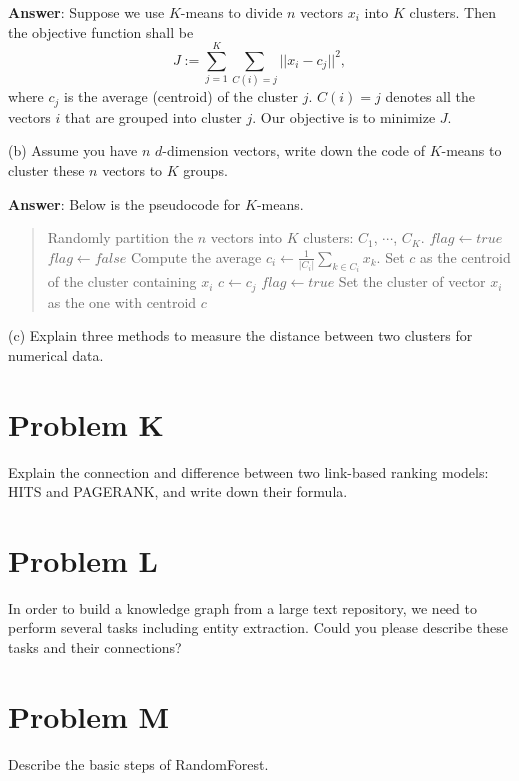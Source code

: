 \documentclass{article}
\begin{document}
{\bf Answer}:
Suppose we use $K$-means to divide $n$ vectors $x_i$ into $K$ clusters. Then the objective function shall be
$$J := \sum_{j=1} ^K \sum_{C(i) = j} ||x_i - c_j||^2,$$
where $c_j$ is the average (centroid) of the cluster $j$. $C(i) = j$ denotes all the vectors $i$ that are grouped into cluster $j$. Our objective is to minimize $J$.

(b) Assume you have $n$ $d$-dimension vectors, write down the code of $K$-means to cluster these $n$ vectors to $K$ groups.

{\bf Answer}: Below is the pseudocode for $K$-means.
\begin{quote}
\centering
\begin{algorithmic}
\State Randomly partition the $n$ vectors into $K$ clusters: $C_1$, $\cdots$, $C_K$.
\State $flag \gets true$
  \State $flag \gets false$
    \State Compute the average $c_i \gets \frac{1}{|C_i|}\sum_{k\in C_i} x_k$.
  \EndFor
    \State Set $c$ as the centroid of the cluster containing $x_i$
        \State $c \gets c_j$
        \State $flag \gets true$
      \EndIf
    \EndFor
    \State  Set the cluster of vector $x_i$ as the one with centroid $c$
  \EndFor
\EndWhile
\end{algorithmic}
\end{quote}

(c) Explain three methods to measure the distance between two clusters for numerical data.

\section{Problem K}
Explain the connection and difference between two link-based ranking models: HITS and PAGERANK, and write down their formula.

\section{Problem L}
In order to build a knowledge graph from a large text repository, we need to perform several tasks including entity extraction. Could you please describe these tasks and their connections?

\section{Problem M}
Describe the basic steps of RandomForest.
\end{document}
